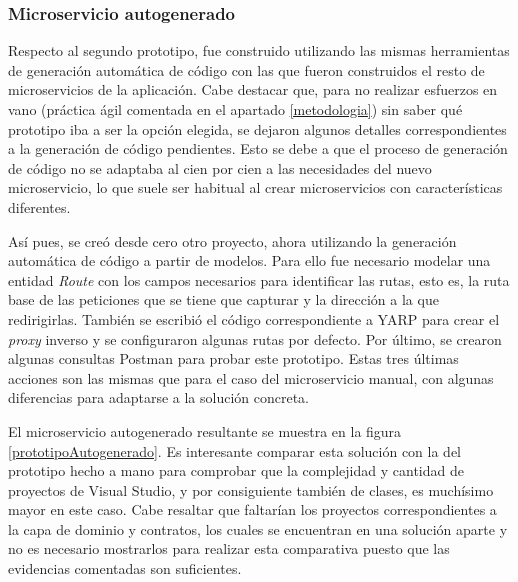 \documentclass[11pt,spanish,listoffigures]{tfgetsinf}
\begin{document}
			\subsubsection{Microservicio autogenerado}

Respecto al segundo prototipo, fue construido utilizando las mismas herramientas de generación automática de código con las que fueron construidos el resto de microservicios de la aplicación. Cabe destacar que, para no realizar esfuerzos en vano (práctica ágil comentada en el apartado \ref{metodologia}) sin saber qué prototipo iba a ser la opción elegida, se dejaron algunos detalles correspondientes a la generación de código pendientes. Esto se debe a que el proceso de generación de código no se adaptaba al cien por cien a las necesidades del nuevo microservicio, lo que suele ser habitual al crear microservicios con características diferentes.

Así pues, se creó desde cero otro proyecto, ahora utilizando la generación automática de código a partir de modelos. Para ello fue necesario modelar una entidad \emph{Route} con los campos necesarios para identificar las rutas, esto es, la ruta base de las peticiones que se tiene que capturar y la dirección a la que redirigirlas. También se escribió el código correspondiente a YARP para crear el \emph{proxy} inverso y se configuraron algunas rutas por defecto. Por último, se crearon algunas consultas Postman para probar este prototipo. Estas tres últimas acciones son las mismas que para el caso del microservicio manual, con algunas diferencias para adaptarse a la solución concreta.

El microservicio autogenerado resultante se muestra en la figura \ref{prototipoAutogenerado}. Es interesante comparar esta solución con la del prototipo hecho a mano para comprobar que la complejidad y cantidad de proyectos de Visual Studio, y por consiguiente también de clases, es muchísimo mayor en este caso. Cabe resaltar que faltarían los proyectos correspondientes a la capa de dominio y contratos, los cuales se encuentran en una solución aparte y no es necesario mostrarlos para realizar esta comparativa puesto que las evidencias comentadas son suficientes.
\end{document}

